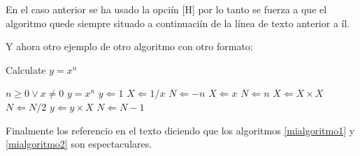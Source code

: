 En el caso anterior se ha usado la opciín [H] por lo tanto se fuerza a que el algoritmo quede siempre situado a continuaciín de la línea de texto anterior a íl.

Y ahora otro ejemplo de otro algoritmo con otro formato:

\begin{algorithm}                      %
\caption{Calculate $y = x^n$}          %
\label{mialgoritmo2}                           %
\begin{algorithmic}                    %
    \Require $n \geq 0 \vee x \neq 0$
    \Ensure $y = x^n$
    \State $y \Leftarrow 1$
        \State $X \Leftarrow 1 / x$
        \State $N \Leftarrow -n$
    \Else
        \State $X \Leftarrow x$
        \State $N \Leftarrow n$
    \EndIf
            \State $X \Leftarrow X \times X$
            \State $N \Leftarrow N / 2$
        \Else[$N$ is odd]
            \State $y \Leftarrow y \times X$
            \State $N \Leftarrow N - 1$
        \EndIf
    \EndWhile
\end{algorithmic}
\end{algorithm}

Finalmente los referencio en el texto diciendo que los algoritmos \ref{mialgoritmo1} y \ref{mialgoritmo2} son espectaculares.
